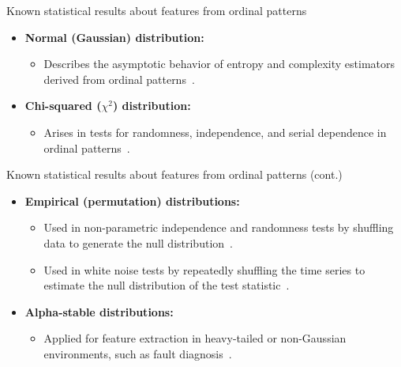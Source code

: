 \documentclass{beamer}
\begin{document}

\begin{frame}{Known statistical results about features from ordinal patterns}
	\begin{itemize}
		\item \textbf{Normal (Gaussian) distribution:}
		\begin{itemize}
			\item Describes the asymptotic behavior of entropy and complexity estimators derived from ordinal patterns~\cite{Chagas2022, Rey2023, Rey2023a, Rey2024, Rey2025}.
		\end{itemize}
		\item \textbf{Chi-squared ($\chi^2$) distribution:}
		\begin{itemize}
			\item Arises in tests for randomness, independence, and serial dependence in ordinal patterns~\cite{Rey2023, Rey2024, Rey2025, YamashitaRiosDeSousa2022, Shternshis2025}.
		\end{itemize}
	\end{itemize}
\end{frame}

\begin{frame}{Known statistical results about features from ordinal patterns (cont.)}
	\begin{itemize}
		\item \textbf{Empirical (permutation) distributions:}
		\begin{itemize}
			\item Used in non-parametric independence and randomness tests by shuffling data to generate the null distribution~\cite{MatillaGarcia2008, AshtariNezhad2019}.
			\item Used in white noise tests by repeatedly shuffling the time series to estimate the null distribution of the test statistic~\cite{Chagas2022a}.
		\end{itemize}
		\item \textbf{Alpha-stable distributions:}
		\begin{itemize}
			\item Applied for feature extraction in heavy-tailed or non-Gaussian environments, such as fault diagnosis~\cite{Chouri2014}.
		\end{itemize}
	\end{itemize}
\end{frame}
\end{document}

